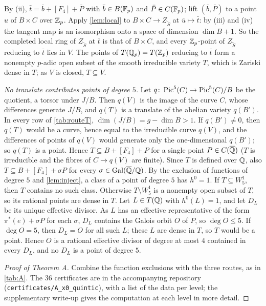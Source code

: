 By (ii), $\bar t=\bar b+[F_4]+\bar P$ with $\bar b\in B(\mathbb{F}_p)$ and $\bar P\in C(\mathbb{F}_p)$; lift $(\bar b,\bar P)$ to a point
$u$ of $B\times C$ over $\mathbb{Z}_p$. Apply \cref{lem:local} to $B\times C\to Z_{\tilde S}$ at $\bar u\mapsto\bar t$: by
(iii) and (iv) the tangent map is an isomorphism onto a space of dimension $\dim B+1$. So the completed local ring of
$Z_{\tilde S}$ at $\bar t$ is that of $B\times C$, and every $\mathbb{Z}_p$-point of $Z_{\tilde S}$ reducing to $\bar t$ lies in
$V$. The points of $T(\mathbb{Q}_p)=T(\mathbb{Z}_p)$ reducing to $\bar t$ form a nonempty $p$-adic open subset of the smooth
irreducible variety $T$, which is Zariski dense in $T$; as $V$ is closed, $T\subseteq V$.

\emph{No translate contributes points of degree $5$.} Let $q\colon\operatorname{Pic}^5(C)\to\operatorname{Pic}^5(C)/B$ be the quotient, a torsor
under $J/B$. Then $q(V)$ is the image of the curve $C$, whose differences generate $J/B$, and $q(T)$ is a translate of
the abelian variety $q(B')$. In every row of \cref{tab:routeT}, $\dim(J/B)=g-\dim B>1$. If $q(B')\ne0$, then $q(T)$
would be a curve, hence equal to the irreducible curve $q(V)$, and the differences of points of $q(V)$ would generate
only the one-dimensional $q(B')$; so $q(T)$ is a point. Hence $T\subseteq B+[F_4]+P$ for a single point
$P\in C(\overline{\mathbb{Q}})$ ($T$ is irreducible and the fibres of $C\to q(V)$ are finite). Since $T$ is defined over $\mathbb{Q}$,
also $T\subseteq B+[F_4]+\sigma P$ for every $\sigma\in\operatorname{Gal}(\overline{\mathbb{Q}}/\mathbb{Q})$.
By the exclusion of functions of degree $5$ and \cref{lem:inject}, a class of a point of degree $5$ has $h^0=1$.
If $T\subseteq W^1_5$, then $T$ contains no such class. Otherwise $T\setminus W^1_5$ is a nonempty open subset of
$T$, so its rational points are dense in $T$. Let $L\in T(\mathbb{Q})$ with $h^0(L)=1$, and let $D_L$ be its unique effective
divisor. As $L$ has an effective
representative of the form $\pi^*(e)+\sigma P$ for each $\sigma$, $D_L$ contains the Galois orbit $O$ of $P$, so
$\deg O\le5$. If $\deg O=5$, then $D_L=O$ for all such $L$; these $L$ are dense in $T$, so $T$ would be a point. Hence
$O$ is a rational effective divisor of degree at most $4$ contained in every $D_L$, and no $D_L$ is a point of
degree $5$.

\begin{proof}[Proof of Theorem A]
Combine the function exclusions with the three routes, as in \cref{tab:A}. The $36$ certificates are in the
accompanying repository (\texttt{certificates/A\_x0\_quintic}), with a list of the data per level; the
supplementary write-up \cite{SuppA} gives the computation at each level in more detail.
\end{proof}

